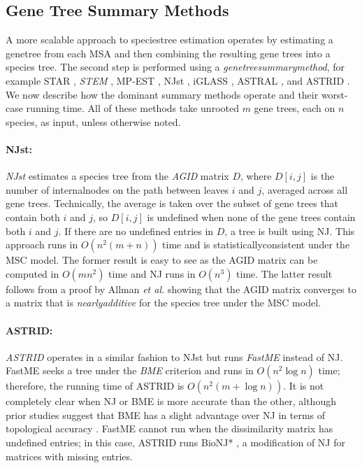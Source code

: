 \subsection{Gene Tree Summary Methods}
\label{sec:background-summary}
A more scalable approach to \gls{speciestree} estimation operates by estimating a \gls{genetree} from each \gls{MSA} and then combining the resulting gene trees into a species tree. 
The second step is performed using a \textit{\gls{genetreesummarymethod}}, for example STAR \cite{liu2009estimating-star}, \textit{\gls{STEM}} \cite{kubatko2009stem}, MP-EST \cite{liu2010maximum-mpest}, NJst \cite{liu2011estimating-njst},  iGLASS \cite{jewett2012iglass}, ASTRAL \cite{mirarab2014astral,mirarab2015astral2}, and ASTRID \cite{vachaspati2015astrid}.
We now describe how the dominant summary methods operate and their worst-case running time.
All of these methods take \gls{unrooted} $m$ gene trees, each on $n$ species, as input, unless otherwise noted.

\paragraph{NJst:}
\textit{\gls{NJst}} \cite{liu2011estimating-njst} estimates a species tree from the \textit{\gls{AGID}} matrix $D$, where $D[i,j]$ is the number of \glspl{internalnode} on the path between leaves $i$ and $j$, averaged across all gene trees.
Technically, the average is taken over the subset of gene trees that contain both $i$ and $j$, so $D[i,j]$ is undefined when none of the gene trees contain both $i$ and $j$.
If there are no undefined entries in $D$, a tree is built using \gls{NJ}.
This approach runs in $O(n^2 (m + n))$ time and is \gls{statisticallyconsistent} under the \gls{MSC} model.
The former result is easy to see as the AGID matrix can be computed in $O(m n^2)$ time and NJ runs in $O(n^3)$ time.
The latter result follows from a proof by Allman {\em et al.} \cite{allman2018species-internode} showing that the AGID matrix converges to a matrix that is \textit{\gls{nearlyadditive}} for the species tree under the MSC model.

\paragraph{ASTRID:} \textit{\gls{ASTRID}} \cite{vachaspati2015astrid} operates in a similar fashion to NJst but runs \textit{\gls{FastME}} \cite{lefort2015fastme2} instead of NJ.
FastME seeks a tree under the \textit{\gls{BME}} criterion and runs in $O(n^2 \log n)$ time; therefore, the running time of ASTRID is $O(n^2 (m + \log{n}))$.
It is not completely clear when NJ or BME is more accurate than the other, although prior studies suggest that BME has a slight advantage over NJ in terms of topological accuracy \cite{desper2004fast, wang2006distance, vachaspati2015astrid}.
FastME cannot run when the dissimilarity matrix has undefined entries; in this case, ASTRID runs BioNJ* \cite{criscuolo2008fast}, a modification of NJ for matrices with missing entries.

